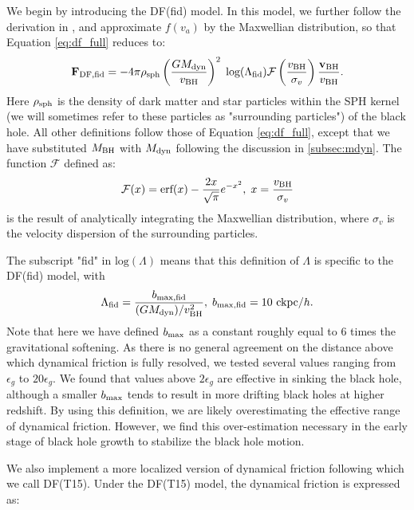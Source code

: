 We begin by introducing the DF(fid) model. In this model, we further follow the derivation in \cite{Binney2008}, and approximate $f(v_a)$ by the Maxwellian distribution, so that Equation \ref{eq:df_full} reduces to:
\begin{equation}
    \label{eq:H14}
    \mathbf{F}_{\rm DF,fid} = -4\pi \rho_{\rm sph} \left(\frac{GM_{\rm dyn}}{v_{\rm BH}}\right)^2  \;\text{log}(\Lambda_{\rm fid}) \mathcal{F}\left(\frac{v_{\rm BH}}{\sigma_v}\right) \frac{\bf{v}_{\rm BH}}{v_{\rm BH}}.
\end{equation}
Here $\rho_{\rm sph}$ is the density of dark matter and star particles within the SPH kernel (we will sometimes refer to these particles as "surrounding particles") of the black hole. All other definitions follow those of Equation \ref{eq:df_full}, except that we have substituted $M_{\rm BH}$ with $M_{\rm dyn}$ following the discussion in \ref{subsec:mdyn}.
The function $\mathcal{F}$ defined as:
\begin{equation}
    \label{eq:fx}
    \mathcal{F}(x) =  \text{erf}(x)-\frac{2x}{\sqrt{\pi}} e^{-x^2}, \;
    x=\frac{v_{\rm BH}}{\sigma_v}
\end{equation}
is the result of analytically integrating the Maxwellian distribution, where $\sigma_v$ is the velocity dispersion of the surrounding particles.

The subscript "fid" in $\text{log}(\Lambda)$ means that this definition of $\Lambda$ is specific to the DF(fid) model, with
\begin{equation}
    \Lambda_{\rm fid} = \frac{b_{\rm max,fid}}{(GM_{\rm dyn})/v_{\rm BH}^2}, \; b_{\rm max,fid} = 10\text{ ckpc}/h.
\end{equation}
Note that here we have defined $b_{\rm max}$ as a constant roughly equal to 6 times the gravitational softening. As there is no general agreement on the distance above which dynamical friction is fully resolved, we tested several values ranging from $\epsilon_g$ to $20\epsilon_g$. We found that values above $2\epsilon_g$ are effective in sinking the black hole, although a smaller $b_{\rm max}$ tends to result in more drifting black holes at higher redshift. By using this definition, we are likely overestimating the effective range of dynamical friction. However, we find this over-estimation necessary in the early stage of black hole growth to stabilize the black hole motion.

We also implement a more localized version of dynamical friction following  \cite{Tremmel2015} which we call DF(T15). Under the DF(T15) model, the dynamical friction is expressed as:

